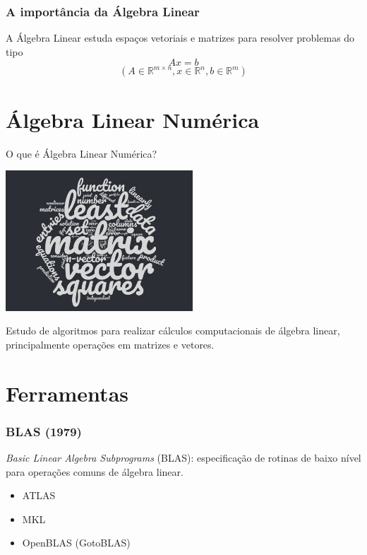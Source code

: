 \documentclass{beamer}
\begin{document}
\begin{darkframes}
  \begin{frame}
    \frametitle{A importância da Álgebra Linear}
    A Álgebra Linear estuda espaços vetoriais e matrizes para resolver problemas do tipo
    $$Ax=b$$
    $$(A\in {\mathbb{R}}^{m\times n}, x\in {\mathbb{R}}^n, b \in {\mathbb{R}}^m)$$
    \vfill
  \end{frame}
  
  \section{Álgebra Linear Numérica}
  
  \begin{frame}{O que é Álgebra Linear Numérica?}
    \begin{center}
      \includegraphics[width=7cm]{figures/wordcloud.png}
    \end{center}
    Estudo de algoritmos para realizar cálculos computacionais de álgebra linear, principalmente operações em matrizes e vetores.
  \end{frame}
  
  \section{Ferramentas}
  
  \begin{frame}
    \frametitle{BLAS (1979)}
    \emph{Basic Linear Algebra Subprograms} (BLAS): especificação de rotinas de baixo nível para operações comuns de álgebra linear. %
    \begin{itemize}
    \item ATLAS
    \item MKL
    \item OpenBLAS (GotoBLAS)
    \end{itemize}
    

\end{frame}
\end{darkframes}
\end{document}
